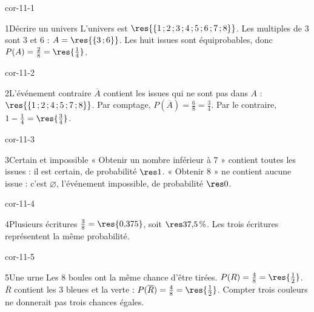 \clearpage\pagestyle{otMain}\setlength{\otBlocEspacement}{2.5mm}\fontsize{11}{15}\selectfont{}
\begin{blocLivre}{cor-11-1}\begin{corrige}{1}{Décrire un univers}
L’univers est $\res{\{1\,;2\,;3\,;4\,;5\,;6\,;7\,;8\}}$. Les multiples de 3 sont 3 et 6 : $A=\res{\{3\,;6\}}$. Les huit issues sont équiprobables, donc $P(A)=\frac28=\res{\frac14}$.
\end{corrige}\end{blocLivre}
\begin{blocLivre}{cor-11-2}\begin{corrige}{2}{L’événement contraire}
$\overline A$ contient les issues qui ne sont pas dans $A$ : $\res{\{1\,;2\,;4\,;5\,;7\,;8\}}$. Par comptage, $P(\overline A)=\frac68=\frac34$. Par le contraire, $1-\frac14=\res{\frac34}$.
\end{corrige}\end{blocLivre}
\begin{blocLivre}{cor-11-3}\begin{corrige}{3}{Certain et impossible}
« Obtenir un nombre inférieur à 7 » contient toutes les issues : il est certain, de probabilité $\res1$. « Obtenir 8 » ne contient aucune issue : c’est $\varnothing$, l’événement impossible, de probabilité $\res0$.
\end{corrige}\end{blocLivre}
\begin{blocLivre}{cor-11-4}\begin{corrige}{4}{Plusieurs écritures}
$\frac38=\res{0{,}375}$, soit $\res{37{,}5\,\%}$. Les trois écritures représentent la même probabilité.
\end{corrige}\end{blocLivre}
\begin{blocLivre}{cor-11-5}\begin{corrige}{5}{Une urne}
Les 8 boules ont la même chance d’être tirées. $P(R)=\frac48=\res{\frac12}$. $\overline R$ contient les 3 bleues et la verte : $P(\overline R)=\frac48=\res{\frac12}$. Compter trois couleurs ne donnerait pas trois chances égales.
\label{fig-cor-11-5}
\end{corrige}\end{blocLivre}
